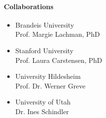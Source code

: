 \newpage
\paragraph{Collaborations}

\begin{itemize}
\item Brandeis University\\ Prof. Margie Lachman, PhD
\item Stanford University\\ Prof. Laura Carstensen, PhD
\item University Hildesheim\\ Prof. Dr. Werner Greve
\item University of Utah\\ Dr. Ines Schindler
\end{itemize}

\begin{bibunit}[apalike]
\nocite{*}
\putbib[profUrsulaStaudinger2]
\end{bibunit}